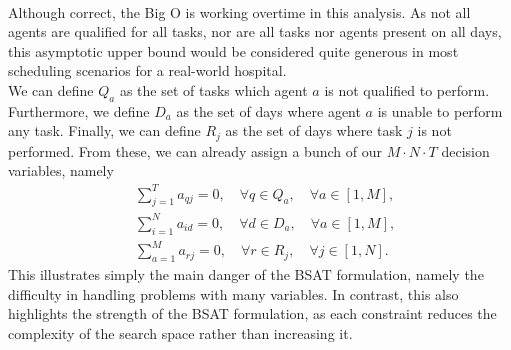 \\
Although correct, the Big O is working overtime in this analysis. As not all agents are qualified for all tasks, nor are all tasks nor agents present on all days, this asymptotic upper bound would be considered quite generous in most scheduling scenarios for a real-world hospital. 
\\
We can define \(Q_a\) as the set of tasks which agent \(a\) is not qualified to perform. Furthermore, we define \(D_a\) as the set of days where agent \(a\) is unable to perform any task. Finally, we can define \(R_j\) as the set of days where task \(j\) is not performed. From these, we can already assign a bunch of our \(M \cdot N \cdot T\) decision variables, namely
\begin{align*}
    &\sum_{j = 1}^T a_{qj} = 0, \quad \forall q \in Q_a, \quad \forall a \in [1, M],
    \\
    &\sum_{i = 1}^N a_{id} = 0, \quad \forall d \in D_a, \quad \forall a \in [1, M],
    \\
    &\sum_{a = 1}^M a_{rj} = 0, \quad \forall r \in R_j, \quad \forall j \in [1, N].
\end{align*}
This illustrates simply the main danger of the BSAT formulation, namely the difficulty in handling problems with many variables. In contrast, this also highlights the strength of the BSAT formulation, as each constraint reduces the complexity of the search space rather than increasing it.